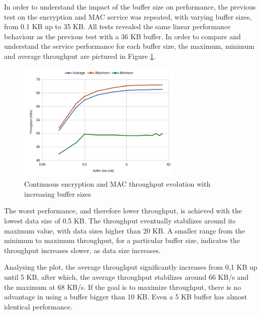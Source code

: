 In order to understand the impact of the buffer size on performance, the previous test on the encryption and MAC service was repeated, with varying buffer sizes, from 0.1 KB up to 35 KB.
All tests revealed the same linear performance behaviour as the previous test with a 36 KB buffer. In order to compare and understand the service performance for each buffer size, the maximum, minimum and average throughput are pictured in Figure \ref{fig:performance:buffer-tput}.
\begin{figure}[h!]
	\centering
	\includegraphics[width=0.7\textwidth]{./Images/buffer-tput.png}
	\caption{Continuous encryption and MAC throughput evolution with increasing buffer sizes}
	\label{fig:performance:buffer-tput}
\end{figure}
The worst performance, and therefore lower throughput, is achieved with the lowest data size of 0.5 KB. The throughput eventually stabilizes around its maximum value, with data sizes higher than 20 KB.
A smaller range from the minimum to maximum throughput, for a particular buffer size, indicates the throughput increases slower, as data size increases.

Analysing the plot, the average throughput significantly increases from 0,1 KB up until 5 KB, after which, the average throughput stabilizes around 66 KB/s and the maximum at 68 KB/s. 
If the goal is to maximize throughput, there is no advantage in using a buffer bigger than 10 KB. Even a 5 KB buffer has almost identical performance. 

